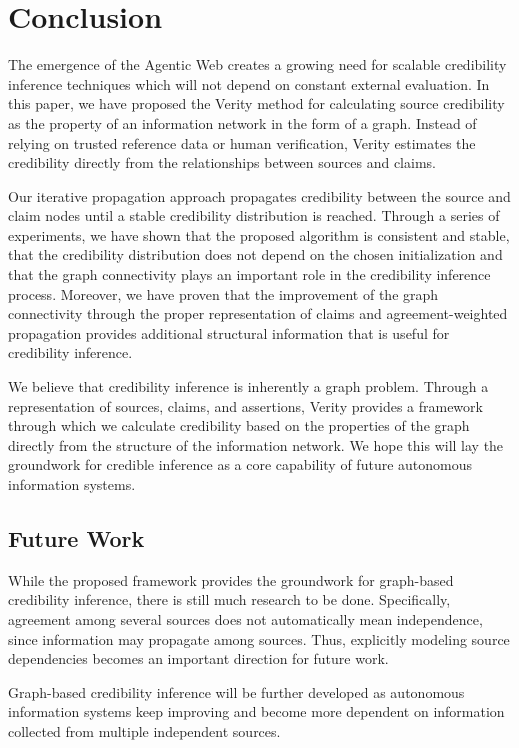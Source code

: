 \section{Conclusion}

The emergence of the Agentic Web creates a growing need for scalable credibility inference techniques which will not depend on constant external evaluation. In this paper, we have proposed the Verity method for calculating source credibility as the property of an information network in the form of a graph. Instead of relying on trusted reference data or human verification, Verity estimates the credibility directly from the relationships between sources and claims.

Our iterative propagation approach propagates credibility between the source and claim nodes until a stable credibility distribution is reached. Through a series of experiments, we have shown that the proposed algorithm is consistent and stable, that the credibility distribution does not depend on the chosen initialization and that the graph connectivity plays an important role in the credibility inference process. Moreover, we have proven that the improvement of the graph connectivity through the proper representation of claims and agreement-weighted propagation provides additional structural information that is useful for credibility inference.

We believe that credibility inference is inherently a graph problem. Through a representation of sources, claims, and assertions, Verity provides a framework through which we calculate credibility based on the properties of the graph directly from the structure of the information network. We hope this will lay the groundwork for credible inference as a core capability of future autonomous information systems.

\subsection{Future Work}

While the proposed framework provides the groundwork for graph-based credibility inference, there is still much research to be done. Specifically, agreement among several sources does not automatically mean independence, since information may propagate among sources. Thus, explicitly modeling source dependencies becomes an important direction for future work.

Graph-based credibility inference will be further developed as autonomous information systems keep improving and become more dependent on information collected from multiple independent sources.